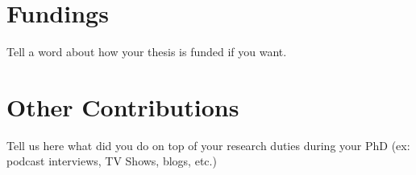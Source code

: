 \section{Fundings}

Tell a word about how your thesis is funded if you want.

\section{Other Contributions}

Tell us here what did you do on top of your research duties during your PhD (ex: podcast interviews, TV Shows, blogs, etc.)

